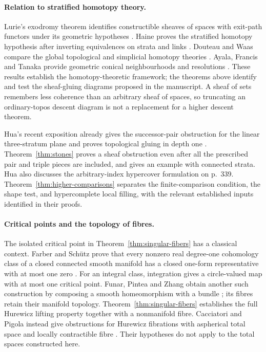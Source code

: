 \documentclass[11pt,a4paper]{article}
\theoremstyle{definition}
\begin{document}
\paragraph{Relation to stratified homotopy theory.}
Lurie's exodromy theorem identifies constructible sheaves of spaces with exit-path functors under its geometric hypotheses \cite[Theorem~A.9.3]{Lurie}. Haine proves the stratified homotopy hypothesis after inverting equivalences on strata and links \cite[Theorem~3.2.4, pp.~25--26]{Haine}. Douteau and Waas compare the global topological and simplicial homotopy theories \cite{DW}. Ayala, Francis and Tanaka provide geometric conical neighbourhoods and resolutions \cite[Theorem~7.3.8]{AFT}. These results establish the homotopy-theoretic framework; the theorems above identify and test the sheaf-gluing diagrams proposed in the manuscript. A sheaf of sets remembers less coherence than an arbitrary sheaf of spaces, so truncating an ordinary-topos descent diagram is not a replacement for a higher descent theorem.

Hua's recent exposition already gives the successor-pair obstruction
for the linear three-stratum plane and proves topological gluing in
depth one \cite[Counterexample~70.3 and the following theorem,
p.~340]{Hua}. Theorem~\ref{thm:stones} proves a sheaf obstruction
even after all the prescribed pair and triple pieces are included,
and gives an example with connected strata. Hua also discusses the
arbitrary-index hypercover formulation on p.~339. Theorem~\ref{thm:higher-comparisons}
separates the finite-comparison condition, the shape test, and
hypercomplete local filling, with the relevant established inputs
identified in their proofs.

\paragraph{Critical points and the topology of fibres.}
The isolated critical point in Theorem~\ref{thm:singular-fibers}
has a classical context. Farber and Sch\"utz prove that every nonzero
real degree-one cohomology class of a closed connected smooth manifold
has a closed one-form representative with at most one zero
\cite[Theorem~1, author-version pp.~1--2]{FarberSchutz}.
For an integral class, integration gives a circle-valued map with at
most one critical point. Funar, Pintea and Zhang obtain another such
construction by composing a smooth homeomorphism with a bundle
\cite[Proposition~4.1, p.~363]{FunarPinteaZhang}; its fibres retain
their manifold topology. Theorem~\ref{thm:singular-fibers} establishes
the full Hurewicz lifting property together with a nonmanifold fibre.
Cacciatori and Pigola instead give obstructions for Hurewicz fibrations
with aspherical total space and locally contractible fibre
\cite[Theorems~1.1--1.2, author-version pp.~1--2]{CacciatoriPigola}.
Their hypotheses do not apply to the total spaces constructed here.
\end{document}
